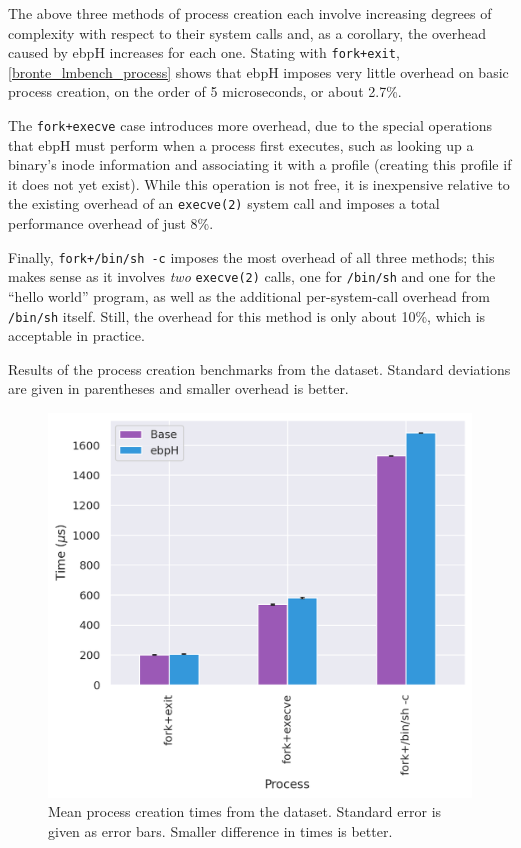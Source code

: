 \documentclass[
  12pt]{findlay}
\newcommand{\passthrough}[1]{#1}
\begin{document}
The above three methods of process creation each involve increasing
degrees of complexity with respect to their system calls and, as a
corollary, the overhead caused by ebpH increases for each one. Stating
with \passthrough{\lstinline!fork+exit!},
\autoref{bronte_lmbench_process} shows that ebpH imposes very little
overhead on basic process creation, on the order of 5 microseconds, or
about 2.7\%.

The \passthrough{\lstinline!fork+execve!} case introduces more overhead,
due to the special operations that ebpH must perform when a process
first executes, such as looking up a binary's inode information and
associating it with a profile (creating this profile if it does not yet
exist). While this operation is not free, it is inexpensive relative to
the existing overhead of an \passthrough{\lstinline!execve(2)!} system
call and imposes a total performance overhead of just 8\%.

Finally, \passthrough{\lstinline!fork+/bin/sh -c!} imposes the most
overhead of all three methods; this makes sense as it involves
\emph{two} \passthrough{\lstinline!execve(2)!} calls, one for
\passthrough{\lstinline!/bin/sh!} and one for the ``hello world''
program, as well as the additional per-system-call overhead from
\passthrough{\lstinline!/bin/sh!} itself. Still, the overhead for this
method is only about 10\%, which is acceptable in practice.

\begin{table}
    \caption[Results of the process creation benchmarks from the  dataset]{
        Results of the process creation benchmarks from the  dataset.
        Standard deviations are given in parentheses and smaller overhead is better.
    }
    \label{bronte_lmbench_process}
    
\end{table}

\begin{figure}
    \caption[Mean process creation times from the  dataset]{
        Mean process creation times from the  dataset.
        Standard error is given as error bars.
        Smaller difference in times is better.
    }
    \label{bronte_lmbench_process_graph}
    \includegraphics[width=.6\textwidth]{../data/bench/bronte-lmbench/process_times.png}
\end{figure}
\end{document}
